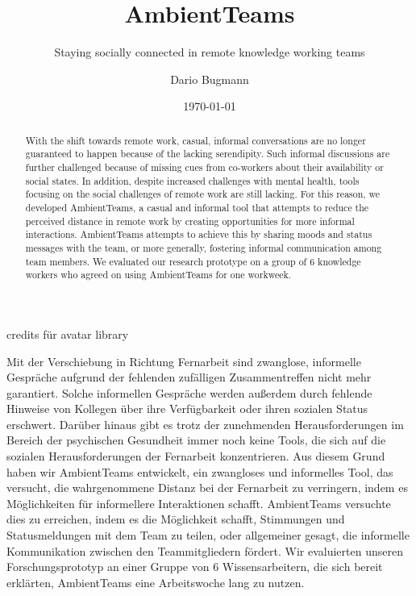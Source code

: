 \documentclass{seal_thesis}
\date{\today}
\title{AmbientTeams}
\subtitle{Staying socially connected in remote knowledge working teams}
\author{Dario Bugmann}
\begin{document}
\maketitle

\frontmatter

\begin{acknowledgements}
    credits für avatar library
\end{acknowledgements}

\begin{abstract}
    With the shift towards remote work, casual, informal conversations are no longer guaranteed to happen because of the lacking serendipity. Such informal discussions are further challenged because of missing cues from co-workers about their availability or social states. In addition, despite increased challenges with mental health, tools focusing on the social challenges of remote work are still lacking. For this reason, we developed AmbientTeams, a casual and informal tool that attempts to reduce the perceived distance in remote work by creating opportunities for more informal interactions. AmbientTeams attempts to achieve this by sharing moods and status messages with the team, or more generally, fostering informal communication among team members. We evaluated our research prototype on a group of 6 knowledge workers who agreed on using AmbientTeams for one workweek.
\end{abstract}

\begin{zusammenfassung}
    Mit der Verschiebung in Richtung Fernarbeit sind zwanglose, informelle Gespräche aufgrund der fehlenden zufälligen Zusammentreffen nicht mehr garantiert. Solche informellen Gespräche werden außerdem durch fehlende Hinweise von Kollegen über ihre Verfügbarkeit oder ihren sozialen Status erschwert. Darüber hinaus gibt es trotz der zunehmenden Herausforderungen im Bereich der psychischen Gesundheit immer noch keine Tools, die sich auf die sozialen Herausforderungen der Fernarbeit konzentrieren. Aus diesem Grund haben wir AmbientTeams entwickelt, ein zwangloses und informelles Tool, das versucht, die wahrgenommene Distanz bei der Fernarbeit zu verringern, indem es Möglichkeiten für informellere Interaktionen schafft. AmbientTeams versuchte dies zu erreichen, indem es die Möglichkeit schafft, Stimmungen und Statusmeldungen mit dem Team zu teilen, oder allgemeiner gesagt, die informelle Kommunikation zwischen den Teammitgliedern fördert. Wir evaluierten unseren Forschungsprototyp an einer Gruppe von 6 Wissensarbeitern, die sich bereit erklärten, AmbientTeams eine Arbeitswoche lang zu nutzen.
\end{zusammenfassung}
\end{document}
